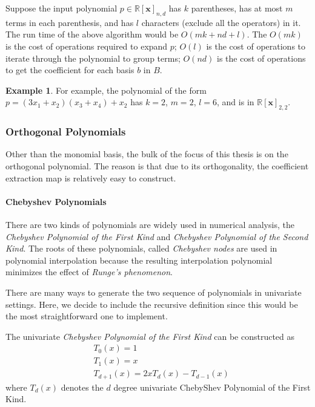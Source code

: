 \documentclass[12pt]{amsart}
\numberwithin{equation}{section}
\theoremstyle{definition}
\newtheorem{example}[thm]{Example}
\numberwithin{thm}{section}
\begin{document}
Suppose the input polynomial $p \in \mathbb{R}[\mathbf{x}]_{n, d}$ has $k$ parentheses, has at most $m$ terms in each parenthesis,
and has $l$ characters (exclude all the operators) in it. 
The run time of the above algorithm would be $O(mk + nd + l)$.
The $O(mk)$ is the cost of operations required to expand $p$;
$O(l)$ is the cost of operations to iterate through the polynomial to group terms;
$O(nd)$ is the cost of operations to get the coefficient for each basis $b$ in $B$.

\begin{example}
     For example, the polynomial of the form $p = (3x_1 + x_2) (x_3 + x_4) + x_2$ has $k = 2$, $m = 2$, $l = 6$, and is in $\mathbb{R}[\mathbf{x}]_{2, 2}$.
\end{example}

\subsubsection{Orthogonal Polynomials}
Other than the monomial basis, the bulk of the focus of this thesis is on the orthogonal polynomial.
The reason is that due to its orthogonality, the coefficient extraction map is relatively easy to construct. 

\smallskip

\paragraph{Chebyshev Polynomials}


There are two kinds of polynomials are widely used in numerical analysis,
the \emph{Chebyshev Polynomial of the First Kind} and \emph{Chebyshev Polynomial of the Second Kind}.
The roots of these polynomials, called \emph{Chebyshev nodes} 
are used in polynomial interpolation because 
the resulting interpolation polynomial minimizes the effect of \emph{Runge's phenomenon}.\cite{Mathews2004Numerical}

There are many ways to generate the two sequence of polynomials in univariate settings. 
Here, we decide to include the recursive definition since this would be the most straightforward one to implement.

The univariate \emph{Chebyshev Polynomial of the First Kind} can be constructed as
\begin{align*} 
     &T_0(x) = 1 \\ 
     &T_1(x) = x \\
     &T_{d+1}(x) = 2x T_d(x) - T_{d-1}(x)
\end{align*}
where $T_d(x)$ denotes the $d$ degree univariate ChebyShev Polynomial of the First Kind.
\end{document}
